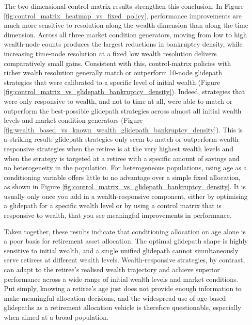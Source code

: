 \documentclass[11pt]{article}
\begin{document}
The two-dimensional control-matrix results strengthen this conclusion. In Figure \ref{fig:control_matrix_heatmap_vs_fixed_policy}, performance improvements are much more sensitive to resolution along the wealth dimension than along the time dimension. Across all three market condition generators, moving from low to high wealth-node counts produces the largest reductions in bankruptcy density, while increasing time-node resolution at a fixed low wealth resolution delivers comparatively small gains. Consistent with this, control-matrix policies with richer wealth resolution generally match or outperform 10-node glidepath strategies that were calibrated to a specific level of initial wealth (Figure \ref{fig:control_matrix_vs_glidepath_bankruptcy_density}). Indeed, strategies that were only responsive to wealth, and not to time at all, were able to match or outperform the best-possible glidepath strategies across almost all initial wealth levels and market condition generators (Figure \ref{fig:wealth_based_vs_known_wealth_glidepath_bankruptcy_density}). This is a striking result: glidepath strategies only seem to match or outperform wealth-responsive strategies when the retiree is at the very highest wealth levels and when the strategy is targeted at a retiree with a specific amount of savings and no heterogeneity in the population. For heterogeneous populations, using age as a conditioning variable offers little to no advantage over a simple fixed allocation, as shown in Figure \ref{fig:control_matrix_vs_glidepath_bankruptcy_density}. It is usually only once you add in a wealth-responsive component, either by optimising a glidepath for a specific wealth level or by using a control matrix that is responsive to wealth, that you see meaningful improvements in performance. 

Taken together, these results indicate that conditioning allocation on age alone is a poor basis for retirement asset allocation. The optimal glidepath shape is highly sensitive to initial wealth, and a single unified glidepath cannot simultaneously serve retirees at different wealth levels. Wealth-responsive strategies, by contrast, can adapt to the retiree's realised wealth trajectory and achieve superior performance across a wide range of initial wealth levels and market conditions. Put simply, knowing a retiree's age just does not provide enough information to make meaningful allocation decisions, and the widespread use of age-based glidepaths as a retirement allocation vehicle is therefore questionable, especially when aimed at a broad population.
\end{document}
